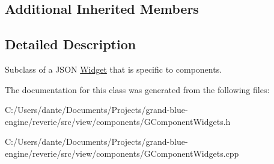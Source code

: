 \subsection*{Additional Inherited Members}


\subsection{Detailed Description}
Subclass of a J\+S\+ON \mbox{\hyperlink{class_widget}{Widget}} that is specific to components. 

The documentation for this class was generated from the following files\+:\begin{DoxyCompactItemize}
\item 
C\+:/\+Users/dante/\+Documents/\+Projects/grand-\/blue-\/engine/reverie/src/view/components/G\+Component\+Widgets.\+h\item 
C\+:/\+Users/dante/\+Documents/\+Projects/grand-\/blue-\/engine/reverie/src/view/components/G\+Component\+Widgets.\+cpp\end{DoxyCompactItemize}
